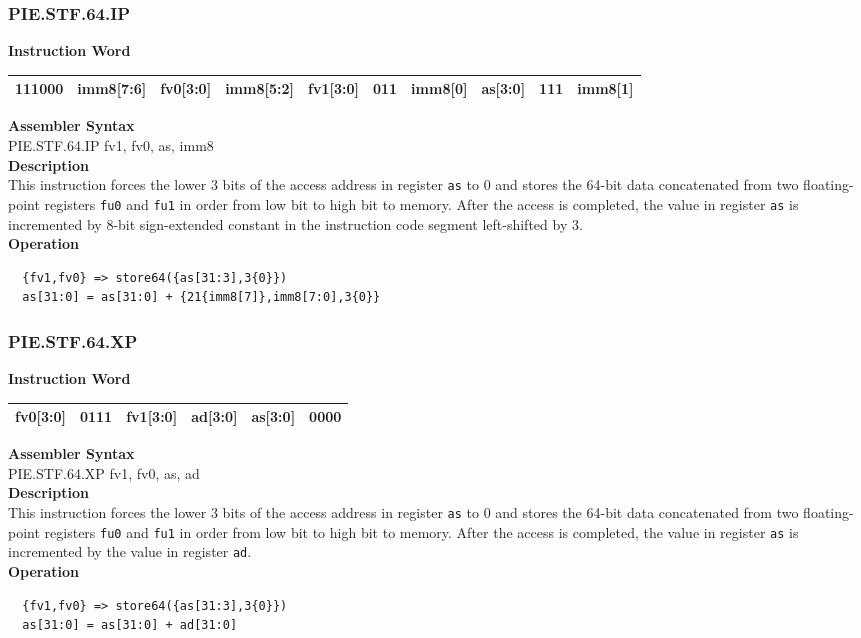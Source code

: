 \newpage
\subsubsection{PIE.STF.64.IP}\label{instruction:PIESTF64IP}
\setlength\tabcolsep{6pt}
\textbf{Instruction Word} \\
\begin{tabular}{|c|c|c|c|c|c|c|c|c|c|}
	\hline
	111000 & imm8[7:6] & fv0[3:0] & imm8[5:2] & fv1[3:0] & 011 & imm8[0] & as[3:0] & 111 & imm8[1] \\
	\hline
\end{tabular}

\textbf{Assembler Syntax} \\
PIE.STF.64.IP fv1, fv0, as, imm8 \\
\textbf{Description} \\
This instruction forces the lower 3 bits of the access address in register \lstinline{as} to 0 and stores the 64-bit data concatenated from two floating-point registers \lstinline{fu0} and \lstinline{fu1} in order from low bit to high bit to memory. After the access is completed, the value in register \lstinline{as} is incremented by 8-bit sign-extended constant in the instruction code segment left-shifted by 3.\\
\textbf{Operation}
\begin{lstlisting}
  {fv1,fv0} => store64({as[31:3],3{0}})
  as[31:0] = as[31:0] + {21{imm8[7]},imm8[7:0],3{0}}
\end{lstlisting}

\newpage
\subsubsection{PIE.STF.64.XP}\label{instruction:PIESTF64XP}
\setlength\tabcolsep{6pt}
\textbf{Instruction Word} \\
\begin{tabular}{|c|c|c|c|c|c|}
	\hline
	fv0[3:0] & 0111 & fv1[3:0] & ad[3:0] & as[3:0] & 0000 \\
	\hline
\end{tabular}

\textbf{Assembler Syntax} \\
PIE.STF.64.XP fv1, fv0, as, ad \\
\textbf{Description} \\
This instruction forces the lower 3 bits of the access address in register \lstinline{as} to 0 and stores the 64-bit data concatenated from two floating-point registers \lstinline{fu0} and \lstinline{fu1} in order from low bit to high bit to memory. After the access is completed, the value in register \lstinline{as} is incremented by the value in register \lstinline{ad}.\\
\textbf{Operation}
\begin{lstlisting}
  {fv1,fv0} => store64({as[31:3],3{0}})
  as[31:0] = as[31:0] + ad[31:0]
\end{lstlisting}

